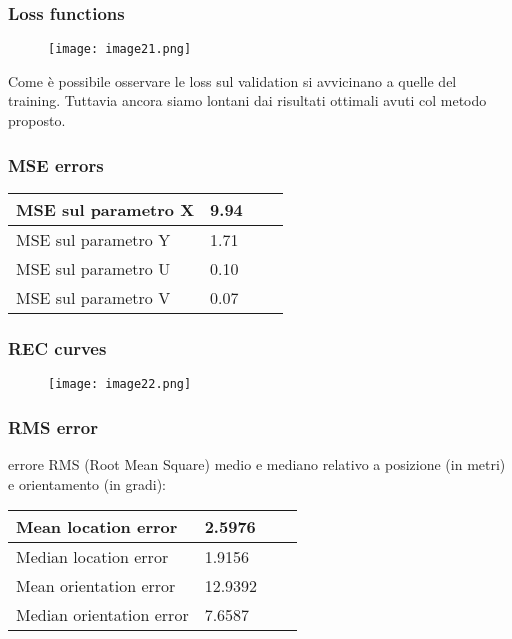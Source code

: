 \subsubsection{Loss functions}
\begin{figure}[H]
	\centering
	\texttt{[image: image21.png]}
\end{figure}
Come è possibile osservare le loss sul validation si avvicinano a quelle del training. Tuttavia ancora siamo lontani dai risultati ottimali avuti col metodo proposto.

\subsubsection{MSE errors}
\begin{center}
	\begin{tabular}{| l | l | l | l |}
		\hline
		MSE sul parametro X & 9.94 \\ \hline
		MSE sul parametro Y & 1.71 \\ \hline
		MSE sul parametro U & 0.10 \\ \hline
		MSE sul parametro V & 0.07 \\ \hline							
	\end{tabular}
\end{center}

\subsubsection{REC curves}
\begin{figure}[H]
	\centering
	\texttt{[image: image22.png]}
\end{figure}

\subsubsection{RMS error}
errore RMS (Root Mean Square) medio e mediano relativo a posizione (in metri) e orientamento (in gradi):
\begin{center}
	\begin{tabular}{| l | l | l | l |}
		\hline
		Mean location error & 2.5976 \\ \hline
		Median location error & 1.9156 \\ \hline
		Mean orientation error & 12.9392 \\ \hline
		Median orientation error & 7.6587 \\ \hline							
	\end{tabular}
\end{center}

